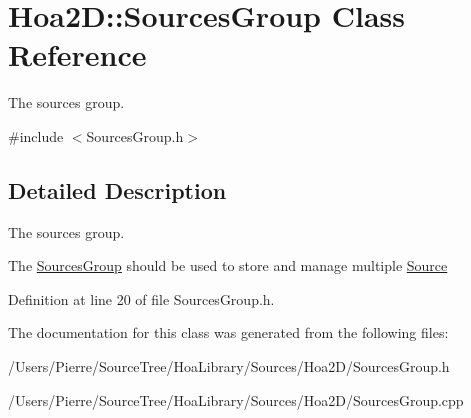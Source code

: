 \hypertarget{class_hoa2_d_1_1_sources_group}{\section{Hoa2\-D\-:\-:Sources\-Group Class Reference}
\label{class_hoa2_d_1_1_sources_group}
}


The sources group.  




{\ttfamily \#include $<$Sources\-Group.\-h$>$}



\subsection{Detailed Description}
The sources group. 

The \hyperlink{class_hoa2_d_1_1_sources_group}{Sources\-Group} should be used to store and manage multiple \hyperlink{class_hoa2_d_1_1_source}{Source} 

Definition at line 20 of file Sources\-Group.\-h.



The documentation for this class was generated from the following files\-:\begin{DoxyCompactItemize}
\item 
/\-Users/\-Pierre/\-Source\-Tree/\-Hoa\-Library/\-Sources/\-Hoa2\-D/Sources\-Group.\-h\item 
/\-Users/\-Pierre/\-Source\-Tree/\-Hoa\-Library/\-Sources/\-Hoa2\-D/Sources\-Group.\-cpp\end{DoxyCompactItemize}
